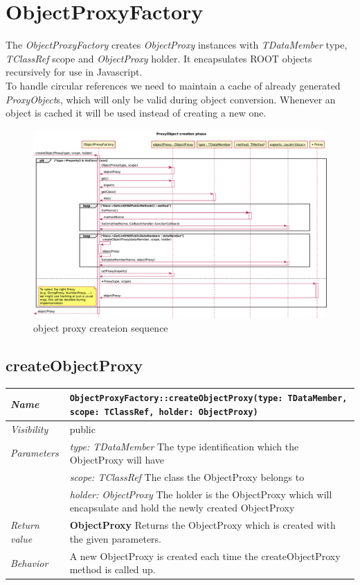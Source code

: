 \chapter{ObjectProxyFactory}
The \textit{ObjectProxyFactory} creates \textit{ObjectProxy} instances with \textit{TDataMember} type, \textit{TClassRef} scope and \textit{ObjectProxy} holder. It encapsulates ROOT objects recursively for use in Javascript.\\

To handle circular references we need to maintain a cache of already generated \textit{ProxyObject}s, which will only be valid during object conversion. Whenever an object is cached it will be used instead of creating a new one.
\begin{figure}[H]
	\centering
	\includegraphics[width=18cm]{./latex/resources/createProxyObject.pdf}
	\caption{object proxy createion sequence}
\end{figure} \pagebreak
\section{createObjectProxy}
\begin{longtable}{p{3cm} @{\hskip 1cm} p{12cm}}
 \hline
\textit{Name} & \texttt{ObjectProxyFactory::createObjectProxy(type: TDataMember, scope: TClassRef, holder: ObjectProxy)}\\
\hline
 \textit{Visibility} & public\\
\hline
\textit{Parameters} & \textit{type: TDataMember} The type identification which the ObjectProxy will have \\
& \textit{scope: TClassRef} The class the ObjectProxy belongs to \\
& \textit{holder: ObjectProxy}  The holder is the ObjectProxy which will encapsulate and hold the newly created ObjectProxy \\
\hline
\textit{Return value} & \textbf{ObjectProxy} Returns the ObjectProxy which is created with the given parameters.\\
  \hline
 \textit{Behavior} & A new ObjectProxy is created each time the createObjectProxy method is called up. \\
\hline
\end{longtable} \pagebreak
